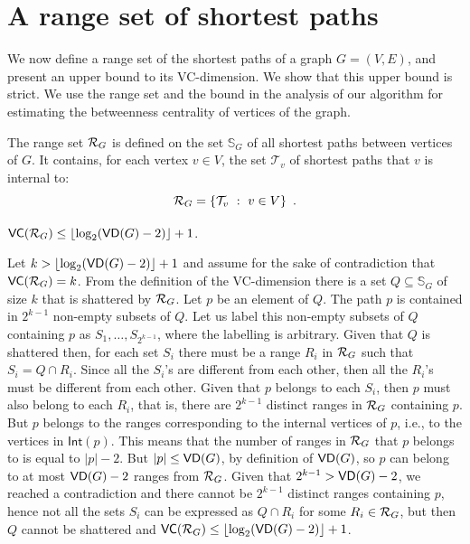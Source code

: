\section{A range set of shortest paths}\label{sec:rangeset}
We now define a range set of the shortest paths of a graph $G=(V,E)$, and present 
an upper bound to its VC-dimension. \XXX We show that this upper bound is strict. We
use the range set and the bound in the analysis of our algorithm for estimating
the betweenness centrality of vertices of the graph.

The range set $\mathcal{R}_G$ is defined on the set $\mathbb{S}_G$ of all shortest
paths between vertices of $G$. It contains, for each vertex $v\in V$, the set
$\mathcal{T}_v$ of shortest paths that $v$ is internal to:
\[
\mathcal{R}_G = \{\mathcal{T}_v ~:~ v\in V\}\enspace.
\]

\begin{lemma}\label{lem:vcdimuppbound}
  $\mathsf{VC}(\mathcal{R}_G)\le\lfloor\log_2(\mathsf{VD}(G)-2)\rfloor+1$.
\end{lemma}

\begin{IEEEproof}
Let $k>\lfloor\log_2(\mathsf{VD}(G)-2)\rfloor+1$ and assume for the sake of contradiction
that $\mathsf{VC}(\mathcal{R}_G)=k$. From the definition of the VC-dimension there is a set
$Q\subseteq\mathbb{S}_G$ of size $k$ that is shattered by $\mathcal{R}_G$. Let $p$ be
an element of $Q$. The path $p$ is contained in $2^{k-1}$ non-empty subsets of
$Q$. Let us label this non-empty subsets of $Q$ containing $p$ as
$S_1,\dotsc,S_{2^{k-1}}$, where the labelling is arbitrary.
Given that $Q$ is shattered then, for each set $S_i$ there must be a range $R_i$ in
$\mathcal{R}_G$ such that $S_i=Q\cap R_i$. Since all the $S_i$'s are
different from each other, then all the $R_i$'s must be different from each
other. Given that $p$ belongs to each $S_i$, then $p$ must also belong to each
$R_i$, that is, there are $2^{k-1}$ distinct ranges in $\mathcal{R}_G$ containing
$p$. But $p$ belongs to the ranges corresponding to the internal vertices of
$p$, i.e., to the vertices in $\mathsf{Int}(p)$. This means that the number of ranges
in $\mathcal{R}_G$ that $p$ belongs to is equal to $|p|-2$. But $|p|\le\mathsf{VD}(G)$, by
definition of $\mathsf{VD}(G)$, so $p$
can belong to at most $\mathsf{VD}(G)-2$ ranges from $\mathcal{R}_G$. Given that
$2^{k-1}>\mathsf{VD}(G)-2$, we reached a contradiction and there cannot be $2^{k-1}$
distinct ranges containing $p$, hence not all the sets $S_i$ can be expressed as
$Q\cap R_i$ for some $R_i\in\mathcal{R}_G$, but then $Q$ cannot be shattered and
$\mathsf{VC}(\mathcal{R}_G)\le\lfloor\log_2(\mathsf{VD}(G)-2)\rfloor+1$.%
\end{IEEEproof}

